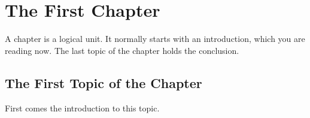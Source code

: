 %
%
%
%
%
%
%
%
%	
%
%

\chapter{The First Chapter}
\label{cha:1}
A chapter is a logical unit. It normally starts with an introduction, which
you are reading now. The last topic of the chapter holds the conclusion.

\section{The First Topic of the Chapter}
First comes the introduction to this topic.


